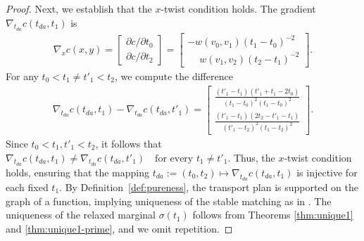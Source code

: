 \documentclass[11pt]{article}
\newcommand{\calT}{{\mathcal T}}
\begin{document}
\begin{proof}
Next, we establish that the $x$-twist condition holds. The gradient $\nabla_{t_{da}} c(t_{da}, t_1)$ is
\begin{align*}
\nabla_x c(x, y) = 
\begin{bmatrix}
\partial c/\partial t_0 \\[0.08in]
\partial c/\partial t_2
\end{bmatrix} =
\begin{bmatrix}
-w(v_0,v_1)(t_1 - t_0)^{-2} \\[0.08in]
\phantom{-}w(v_1,v_2)(t_2 - t_1)^{-2}
\end{bmatrix}.
\end{align*}
For any $t_0 < t_1 \neq t'_1 < t_2$, we compute the difference
\begin{align*}
\nabla_{t_{da}} c(t_{da}, t_1) - \nabla_{t_{da}} c(t_{da}, t'_1) =
\begin{bmatrix}
\frac{(t'_1 - t_1)(t'_1 + t_1 - 2t_0)}{(t_1 - t_0)^2(t_1 - t_0)^2} \\[0.08in]
\frac{(t'_1 - t_1)(2t_2 - t'_1 - t_1)}{(t'_1 - t_2)^2(t_1 - t_2)^2}
\end{bmatrix}.
\end{align*}
Since $t_0 <t_1, t'_1 < t_2$, it follows that
$\nabla_{t_{da}} c(t_{da}, t_1) \neq \nabla_{t_{da}} c(t_{da}, t'_1) \quad \text{for every } t_1 \neq t'_1$.
Thus, the $x$-twist condition holds, ensuring that the mapping $t_{da}:=(t_0,t_2) \mapsto \nabla_{t_{da}} c(t_{da}, t_1)$ is injective for each fixed $t_1$. By Definition~\ref{def:pureness}, the transport plan is supported on the graph of a function, implying uniqueness of the stable matching as in \cite[Corollary 4]{chiappori2016multidimensional}. The uniqueness of the relaxed marginal $\sigma(t_1)$ follows from Theorems \ref{thm:unique1} and \ref{thm:unique1-prime}, and we omit repetition.
\end{proof}    
\end{document}
